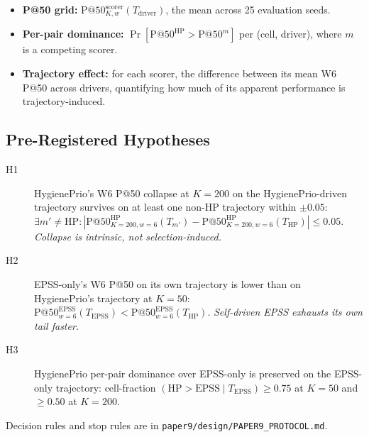 \begin{itemize}
\item \textbf{P@50 grid:} $\mathrm{P@50}^{\mathrm{scorer}}_{K, w}(T_{\mathrm{driver}})$,
the mean across 25 evaluation seeds.
\item \textbf{Per-pair dominance:} $\Pr[\mathrm{P@50}^{\mathrm{HP}} >
\mathrm{P@50}^{m}]$ per (cell, driver), where $m$ is a competing scorer.
\item \textbf{Trajectory effect:} for each scorer, the difference
between its mean W6 P@50 across drivers, quantifying how much of its
apparent performance is trajectory-induced.
\end{itemize}

\subsection{Pre-Registered Hypotheses}

\begin{description}
\item[H1] HygienePrio's W6 P@50 collapse at $K = 200$ on the
HygienePrio-driven trajectory survives on at least one non-HP trajectory
within $\pm 0.05$: $\exists m' \neq \mathrm{HP}: |\mathrm{P@50}^{\mathrm{HP}}_{K=200, w=6}(T_{m'}) -
\mathrm{P@50}^{\mathrm{HP}}_{K=200, w=6}(T_{\mathrm{HP}})| \leq 0.05$.
\textit{Collapse is intrinsic, not selection-induced.}
\item[H2] EPSS-only's W6 P@50 on its own trajectory is lower than on
HygienePrio's trajectory at $K = 50$:
$\mathrm{P@50}^{\mathrm{EPSS}}_{w=6}(T_{\mathrm{EPSS}}) <
\mathrm{P@50}^{\mathrm{EPSS}}_{w=6}(T_{\mathrm{HP}})$.
\textit{Self-driven EPSS exhausts its own tail faster.}
\item[H3] HygienePrio per-pair dominance over EPSS-only is preserved
on the EPSS-only trajectory: cell-fraction $(\mathrm{HP} > \mathrm{EPSS}
\mid T_{\mathrm{EPSS}}) \geq 0.75$ at $K = 50$ and $\geq 0.50$ at $K = 200$.
\end{description}

Decision rules and stop rules are in
\texttt{paper9/design/PAPER9\_PROTOCOL.md}.
